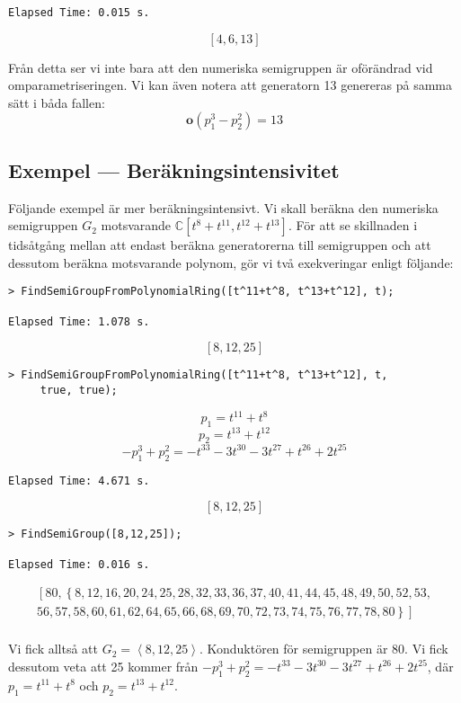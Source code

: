\begin{verbatim}
Elapsed Time: 0.015 s.
\end{verbatim}
\[\left[4, 6, 13\right]\]

Från detta ser vi inte bara att den numeriska semigruppen är oförändrad vid omparametriseringen. Vi kan även notera att generatorn 13 genereras på samma sätt i båda fallen:
\[\mathbf{o}(p_1^3 - p_2^2) = 13\]

\subsection{Exempel --- Beräkningsintensivitet}
\label{CostRingExample}

Följande exempel är mer beräkningsintensivt. Vi skall beräkna den numeriska semigruppen $G_2$ motsvarande $\mathbb{C}\left[t^8 + t^{11}, t^{12} + t^{13}\right]$. För att se skillnaden i tidsåtgång mellan att endast beräkna generatorerna till semigruppen och att dessutom beräkna motsvarande polynom, gör vi två exekveringar enligt följande:

\begin{verbatim}
> FindSemiGroupFromPolynomialRing([t^11+t^8, t^13+t^12], t);

Elapsed Time: 1.078 s.
\end{verbatim}
\[\left[8, 12, 25\right]\]

\begin{verbatim}
> FindSemiGroupFromPolynomialRing([t^11+t^8, t^13+t^12], t, 
     true, true);
\end{verbatim}
\[p_1 = t^{11} + t^8 \]
\[p_2 = t^{13} + t^{12} \]
\[-p_1^3+p_2^2 = -t^{33}-3t^{30}-3t^{27}+t^{26}+2t^{25}\]
\begin{verbatim}
Elapsed Time: 4.671 s.
\end{verbatim}
\[\left[8, 12, 25\right]\]

\begin{verbatim}
> FindSemiGroup([8,12,25]);

Elapsed Time: 0.016 s.
\end{verbatim}
\[
\begin{array}{l}
\left[80, \left\{8, 12, 16, 20, 24, 25, 28, 32, 33, 36, 37, 40, 41, 44, 45, 48, 49, 50, 52, 53,\right.\right.\\
\left.\left.56, 57, 58, 60, 61, 62, 64, 65, 66, 68, 69, 70, 72, 73, 74, 75, 76, 77, 78, 80\right\}\right]\\
\end{array}
\]

Vi fick alltså att $G_2 = \left<8, 12, 25\right>$. Konduktören för semigruppen är 80. Vi fick dessutom veta att 25 kommer från $-p_1^3 +p_2^2 = -t^{33}-3t^{30}-3t^{27}+t^{26}+2t^{25}$, där $p_1 = t^{11} + t^8$ och $p_2 = t^{13} + t^{12}$.

